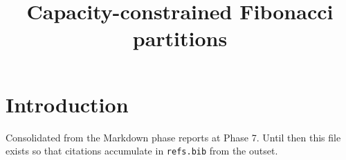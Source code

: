 \documentclass[11pt]{amsart}
\title{Capacity-constrained Fibonacci partitions}
\begin{document}
\maketitle

\section{Introduction}
Consolidated from the Markdown phase reports at Phase 7. Until then this file
exists so that citations accumulate in \texttt{refs.bib} from the outset.



\end{document}
